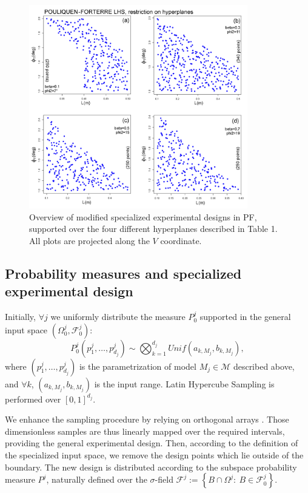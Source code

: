 \documentclass[nhess, manuscript]{copernicus}
\begin{document}
\begin{figure}[H]
\centering
\includegraphics[width=0.85\textwidth]{FigA1.png}
\caption{Overview of modified specialized experimental designs in PF, supported over the four different hyperplanes described in Table 1. All plots are projected along the $V$ coordinate.}
\label{FigA1}
\end{figure}

\subsection{Probability measures and specialized experimental design}
Initially, $\forall j$ we uniformly distribute the measure $P_0^j$ supported in the general input space $(\Omega_0^j, \mathcal F^j_0)$:
\begin{equation}
P_0^j\left(p^j_1,\dots,p^j_{d_j}\right)\sim \bigotimes_{k=1}^{d_j} Unif(a_{k,{M_j}},b_{k,{M_j}}),
\end{equation}
where $(p^j_1,\dots,p^j_{d_j})$ is the parametrization of model $M_j\in\mathcal M$ described above, and $\forall k$, $\left(a_{k,{M_j}},b_{k,{M_j}}\right)$ is the input range. Latin Hypercube Sampling is performed over $[0,1]^{d_j}$.

We enhance the sampling procedure by relying on orthogonal arrays \citep{Owen1992a,Tang1993, Patra2018}. Those dimensionless samples are thus linearly  mapped over the required intervals, providing the general experimental design. Then, according to the definition of the specialized input space, we remove the design points which lie outside of the boundary. The new design is distributed according to the subspace probability measure $P^j$, naturally defined over the $\sigma$-field $\mathcal F^j:=\left\{B\cap\Omega^j:\ B\in\mathcal F_0^j\right\}$.
\end{document}
